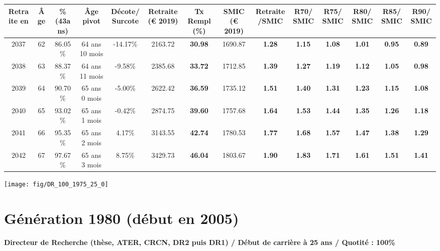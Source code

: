 \begin{adjustbox}{max width=\textwidth} 
\begin{tabular}[htb]{|c|c||c|c|c||c|c||c|c||c|c|c|c|c|} 
\hline 
 Retraite en &  Âge &  \%(43ans) &  Âge pivot &  Décote/Surcote &  Retraite (\euro{} 2019) &  Tx Rempl(\%) &  SMIC (\euro{} 2019) &  Retraite/SMIC &  R70/SMIC &  R75/SMIC &  R80/SMIC &  R85/SMIC &  R90/SMIC \\ 
\hline \hline 
 2037 &  62 &  86.05\% &  64 ans 10 mois &  -14.17\% &  2163.72 &  {\bf 30.98} &  1690.87 &  {\bf 1.28} &  {\bf 1.15} &  {\bf 1.08} &  {\bf 1.01} &  {\bf {\color{red} 0.95}} &  {\bf {\color{red} 0.89}} \\ 
\hline 
 2038 &  63 &  88.37\% &  64 ans 11 mois &  -9.58\% &  2385.68 &  {\bf 33.72} &  1712.85 &  {\bf 1.39} &  {\bf 1.27} &  {\bf 1.19} &  {\bf 1.12} &  {\bf 1.05} &  {\bf {\color{red} 0.98}} \\ 
\hline 
 2039 &  64 &  90.70\% &  65 ans 0 mois &  -5.00\% &  2622.42 &  {\bf 36.59} &  1735.12 &  {\bf 1.51} &  {\bf 1.40} &  {\bf 1.31} &  {\bf 1.23} &  {\bf 1.15} &  {\bf 1.08} \\ 
\hline 
 2040 &  65 &  93.02\% &  65 ans 1 mois &  -0.42\% &  2874.75 &  {\bf 39.60} &  1757.68 &  {\bf 1.64} &  {\bf 1.53} &  {\bf 1.44} &  {\bf 1.35} &  {\bf 1.26} &  {\bf 1.18} \\ 
\hline 
 2041 &  66 &  95.35\% &  65 ans 2 mois &  4.17\% &  3143.55 &  {\bf 42.74} &  1780.53 &  {\bf 1.77} &  {\bf 1.68} &  {\bf 1.57} &  {\bf 1.47} &  {\bf 1.38} &  {\bf 1.29} \\ 
\hline 
 2042 &  67 &  97.67\% &  65 ans 3 mois &  8.75\% &  3429.73 &  {\bf 46.04} &  1803.67 &  {\bf 1.90} &  {\bf 1.83} &  {\bf 1.71} &  {\bf 1.61} &  {\bf 1.51} &  {\bf 1.41} \\ 
\hline 
\hline 
\end{tabular} 
\end{adjustbox} 
 
 \vspace{0.1cm} 

 {\hspace{-2.2cm}\texttt{[image: fig/DR\_100\_1975\_25\_0]}} 

\newpage 
 
\section{Génération 1980 (début en 2005)\label{DR_100_1980_25_0}} 
 
{\bf \noindent Directeur de Recherche (thèse, ATER, CRCN, DR2 puis DR1) / Début de carrière à 25 ans / Quotité : 100\%}  ~ 

